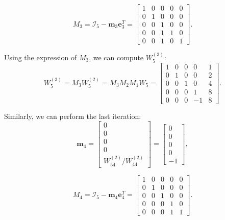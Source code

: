 \documentclass[a4paper]{report}
\numberwithin{equation}{chapter}
\begin{document}
\begin{equation}\label{key}
	M_3=\mathcal{I}_5 - \textbf{m}_3\textbf{e}_3^T =
	\begin{bmatrix}
		1 & 0  & 0  & 0  & 0  \\
		0 & 1 & 0 & 0 & 0\\
		0 & 0 & 1 & 0 & 0 \\
		0 & 0 & 1 & 1 & 0 \\
		0 & 0 & 1 & 0 & 1 
	\end{bmatrix}.
\end{equation}
	
\noindent Using the expression of $M_3$, we can compute $W_5^{(3)}$:
\begin{equation}\label{key}
	W_5^{(3)} = M_3 W_5^{(2)} = M_3 M_2 M_1 W_5 =
	\begin{bmatrix}
		1 & 0  & 0  & 0  & 1  \\
		0 & 1 & 0 & 0 & 2 \\
		0 & 0 & 1 & 0 & 4 \\
		0 & 0 & 0 & 1 & 8 \\
		0 & 0 & 0 & -1 & 8 
	\end{bmatrix}.
\end{equation}

\noindent Similarly, we can perform the last iteration:
\begin{equation}\label{key}
	\textbf{m}_4 = 
	\begin{bmatrix}
		0\\
		0\\
		0\\
		0\\
		{W^{(2)}_{54}}/{W^{(2)}_{44}}
	\end{bmatrix}=
	\begin{bmatrix}
		0\\
		0\\
		0\\
		0\\
		-1
	\end{bmatrix},
\end{equation}

\begin{equation}\label{key}
	M_4=\mathcal{I}_5 - \textbf{m}_4\textbf{e}_4^T =
	\begin{bmatrix}
		1 & 0  & 0  & 0  & 0  \\
		0 & 1 & 0 & 0 & 0\\
		0 & 0 & 1 & 0 & 0 \\
		0 & 0 & 0 & 1 & 0 \\
		0 & 0 & 0 & 1 & 1 
	\end{bmatrix}.
\end{equation}
\end{document}
